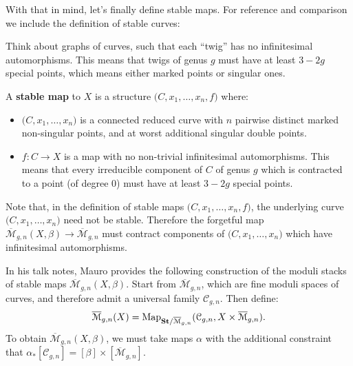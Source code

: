 With that in mind, let's finally define stable maps. For reference and comparison we include the definition of stable
curves:

\begin{defin}
\label{def:stable_curve}
\end{defin}

Think about graphs of curves, such that each ``twig'' has no infinitesimal automorphisms. This means that twigs of
genus $g$ must have at least $3 - 2g$ special points, which means either marked points or singular ones.


\begin{defin}[2.4.1 in \cite{km_gw}]
A \textbf{stable map} to $X$ is a structure $\big(C, x_1, \dots, x_n, f\big)$ where:
\begin{itemize}
\item $\big(C, x_1, \dots, x_n\big)$ is a connected reduced curve with $n$ pairwise distinct marked non-singular points,
and at worst additional singular double points.
\item $f:C \to X$ is a map with no non-trivial infinitesimal automorphisms. This means that every irreducible component of
$C$ of genus $g$ which is contracted to a point (of degree 0) must have at least $3-2g$ special points.
\end{itemize}
\end{defin}

\begin{rem}
Note that, in the definition of stable maps $\big(C, x_1, \dots, x_n, f\big)$, the underlying curve
$\big(C, x_1, \dots, x_n\big)$ need not be stable. Therefore the forgetful map $\overline{\mathcal{M}}_{g,n}(X,\beta)
\to \overline{\mathcal{M}}_{g,n}$ must contract components of $\big(C, x_1, \dots, x_n\big)$ which have infinitesimal
automorphisms.
\end{rem}

In his talk notes, Mauro provides the following construction of the moduli stacks of stable maps
$\overline{\mathcal{M}}_{g,n}(X,\beta)$. Start from $\overline{\mathcal{M}}_{g,n}$, which are fine moduli spaces of
curves, and therefore admit a universal family $\mathcal{C}_{g,n}$. Then define:
\begin{equation}
\label{underived_moduli_stack}
	\overline{\mathcal{M}}_{g,n}(X) = 
\operatorname{Map}_{\mathbf{St} / \overline{\mathcal{M}}_{g,n}}(\mathcal{C}_{g,n},  X \times \overline{\mathcal{M}}_{g,n}).
\end{equation}
To obtain $\overline{\mathcal{M}}_{g,n}(X, \beta)$, we must take maps $\alpha$ with the additional constraint that
$\alpha_*[\mathcal{C}_{g,n}] = [\beta] \times [\overline{\mathcal{M}}_{g,n}]$. 

